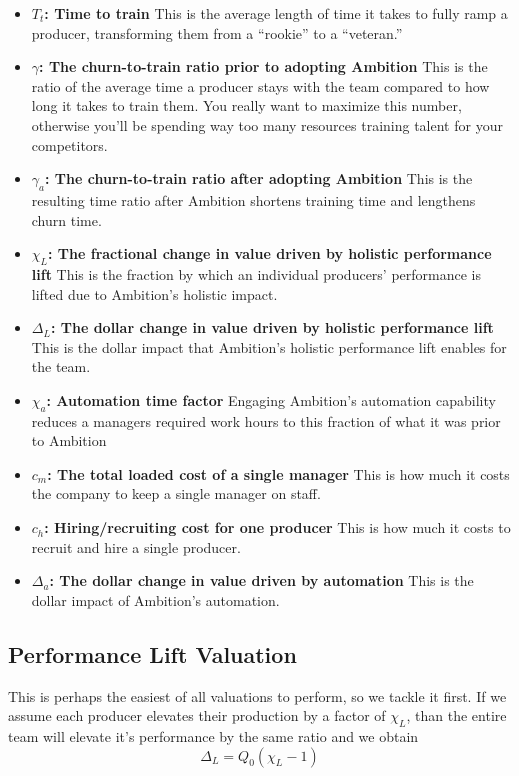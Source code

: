 \documentclass[paper=a4, fontsize=11pt abstract]{scrartcl}
\numberwithin{equation}{section}		%
\numberwithin{figure}{section}			%
\numberwithin{table}{section}				%
\begin{document}
\begin{itemize}
    \item $T_t$\textbf{: Time to train} This is the average length of time it takes to fully ramp a producer, transforming them from a ``rookie'' to a ``veteran.'' 
    \item $\gamma$\textbf{: The churn-to-train ratio prior to adopting Ambition} This is the ratio of the average time a producer stays with the team compared to how long it takes to train them.  You really want to maximize this number, otherwise you'll be spending way too many resources training talent for your competitors.
    \item $\gamma_a$\textbf{: The churn-to-train ratio after adopting Ambition} This is the resulting time ratio after Ambition shortens training time and lengthens churn time. 
    \item $\chi_L$\textbf{: The fractional change in value driven by holistic performance lift} This is the fraction by which an individual producers' performance is lifted due to Ambition's holistic impact.
    \item $\Delta_L$\textbf{: The dollar change in value driven by holistic performance lift} This is the dollar impact that Ambition's holistic performance lift enables for the team.
    \item $\chi_a$\textbf{: Automation time factor} Engaging Ambition's automation capability reduces a managers required work hours to this fraction of what it was prior to Ambition
    \item $c_m$\textbf{: The total loaded cost of a single manager} This is how much it costs the company to keep a single manager on staff.
    \item $c_h$\textbf{: Hiring/recruiting cost for one producer} This is how much it costs to recruit and hire a single producer.
    \item $\Delta_a$\textbf{: The dollar change in value driven by automation} This is the dollar impact of Ambition's automation.
\end{itemize}

\subsection{Performance Lift Valuation}
This is perhaps the easiest of all valuations to perform, so we tackle it first.  If we assume each producer elevates their production by a factor of $\chi_L$, than the entire team will elevate it's performance by the same ratio and we obtain
\begin{equation}
    \Delta_L = Q_0\left(\chi_L - 1\right)
\end{equation}
\end{document}

